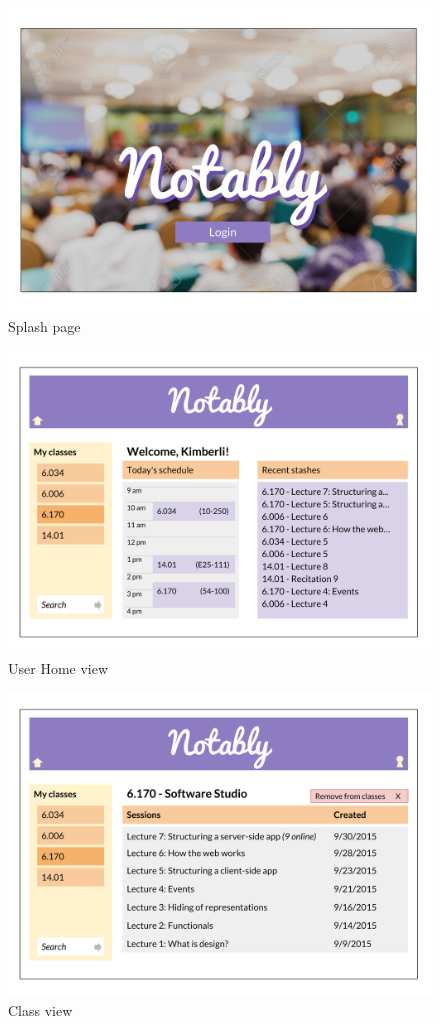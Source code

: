 \documentclass{article}
\begin{document}
\begin{figure}[h!]
  \caption{Splash page}
  \centering
    \includegraphics[width=6in]{UI4.png}
\end{figure}

\begin{figure}[h!]
  \caption{User Home view}
  \centering
    \includegraphics[width=6in]{UI3.png}
\end{figure}

\begin{figure}[h!]
  \caption{Class view}
  \centering
    \includegraphics[width=6in]{UI2.png}
\end{figure}
\end{document}
